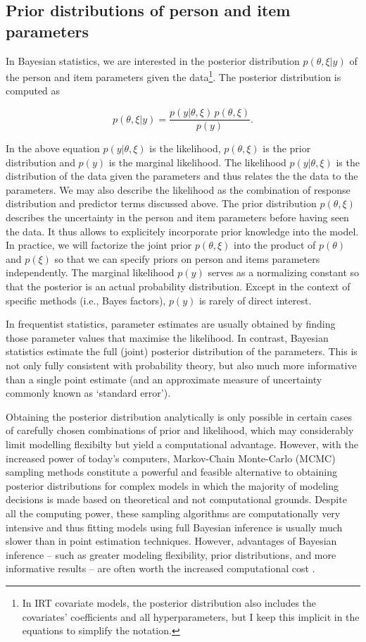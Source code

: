 \documentclass[jss]{jss}
\begin{document}
\hypertarget{priors}{%
\subsection{Prior distributions of person and item
parameters}\label{priors}}

In Bayesian statistics, we are interested in the posterior distribution
\(p(\theta, \xi | y)\) of the person and item parameters given the
data\footnote{In IRT covariate models, the posterior distribution also includes
the covariates' coefficients and all hyperparameters, but I keep this implicit
in the equations to simplify the notation.}. The posterior distribution
is computed as

\[
p(\theta, \xi | y) = \frac{p(y | \theta, \xi) \, p(\theta, \xi)}{p(y)}.
\]

In the above equation \(p(y | \theta, \xi)\) is the likelihood,
\(p(\theta, \xi)\) is the prior distribution and \(p(y)\) is the
marginal likelihood. The likelihood \(p(y | \theta, \xi)\) is the
distribution of the data given the parameters and thus relates the the
data to the parameters. We may also describe the likelihood as the
combination of response distribution and predictor terms discussed
above. The prior distribution \(p(\theta, \xi)\) describes the
uncertainty in the person and item parameters before having seen the
data. It thus allows to explicitely incorporate prior knowledge into the
model. In practice, we will factorize the joint prior \(p(\theta, \xi)\)
into the product of \(p(\theta)\) and \(p(\xi)\) so that we can specify
priors on person and items parameters independently. The marginal
likelihood \(p(y)\) serves as a normalizing constant so that the
posterior is an actual probability distribution. Except in the context
of specific methods (i.e., Bayes factors), \(p(y)\) is rarely of direct
interest.

In frequentist statistics, parameter estimates are usually obtained by
finding those parameter values that maximise the likelihood. In
contrast, Bayesian statistics estimate the full (joint) posterior
distribution of the parameters. This is not only fully consistent with
probability theory, but also much more informative than a single point
estimate (and an approximate measure of uncertainty commonly known as
`standard error').

Obtaining the posterior distribution analytically is only possible in
certain cases of carefully chosen combinations of prior and likelihood,
which may considerably limit modelling flexibilty but yield a
computational advantage. However, with the increased power of today's
computers, Markov-Chain Monte-Carlo (MCMC) sampling methods constitute a
powerful and feasible alternative to obtaining posterior distributions
for complex models in which the majority of modeling decisions is made
based on theoretical and not computational grounds. Despite all the
computing power, these sampling algorithms are computationally very
intensive and thus fitting models using full Bayesian inference is
usually much slower than in point estimation techniques. However,
advantages of Bayesian inference -- such as greater modeling
flexibility, prior distributions, and more informative results -- are
often worth the increased computational cost \citep{gelman2013}.
\end{document}
